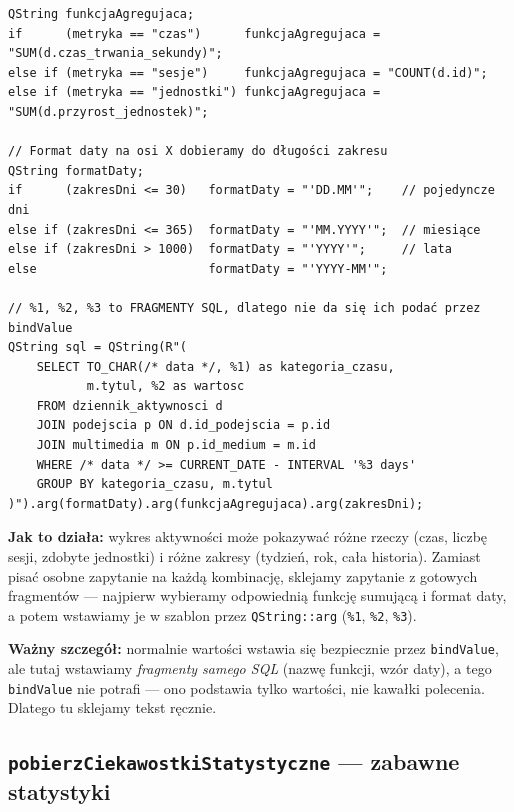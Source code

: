 \documentclass[11pt,a4paper]{article}
\begin{document}
\begin{lstlisting}[caption={Część zapytania zależy od wyboru użytkownika}]
QString funkcjaAgregujaca;
if      (metryka == "czas")      funkcjaAgregujaca = "SUM(d.czas_trwania_sekundy)";
else if (metryka == "sesje")     funkcjaAgregujaca = "COUNT(d.id)";
else if (metryka == "jednostki") funkcjaAgregujaca = "SUM(d.przyrost_jednostek)";

// Format daty na osi X dobieramy do długości zakresu
QString formatDaty;
if      (zakresDni <= 30)   formatDaty = "'DD.MM'";    // pojedyncze dni
else if (zakresDni <= 365)  formatDaty = "'MM.YYYY'";  // miesiące
else if (zakresDni > 1000)  formatDaty = "'YYYY'";     // lata
else                        formatDaty = "'YYYY-MM'";

// %1, %2, %3 to FRAGMENTY SQL, dlatego nie da się ich podać przez bindValue
QString sql = QString(R"(
    SELECT TO_CHAR(/* data */, %1) as kategoria_czasu,
           m.tytul, %2 as wartosc
    FROM dziennik_aktywnosci d
    JOIN podejscia p ON d.id_podejscia = p.id
    JOIN multimedia m ON p.id_medium = m.id
    WHERE /* data */ >= CURRENT_DATE - INTERVAL '%3 days'
    GROUP BY kategoria_czasu, m.tytul
)").arg(formatDaty).arg(funkcjaAgregujaca).arg(zakresDni);
\end{lstlisting}

\textbf{Jak to działa:} wykres aktywności może pokazywać różne rzeczy (czas, liczbę
sesji, zdobyte jednostki) i różne zakresy (tydzień, rok, cała historia). Zamiast
pisać osobne zapytanie na każdą kombinację, sklejamy zapytanie z gotowych
fragmentów --- najpierw wybieramy odpowiednią funkcję sumującą i format daty,
a potem wstawiamy je w szablon przez \texttt{QString::arg} (\texttt{\%1},
\texttt{\%2}, \texttt{\%3}).

\textbf{Ważny szczegół:} normalnie wartości wstawia się bezpiecznie przez
\texttt{bindValue}, ale tutaj wstawiamy \emph{fragmenty samego SQL} (nazwę funkcji,
wzór daty), a tego \texttt{bindValue} nie potrafi --- ono podstawia tylko wartości,
nie kawałki polecenia. Dlatego tu sklejamy tekst ręcznie.

\subsection{\texttt{pobierzCiekawostkiStatystyczne} --- zabawne statystyki}
\end{document}
